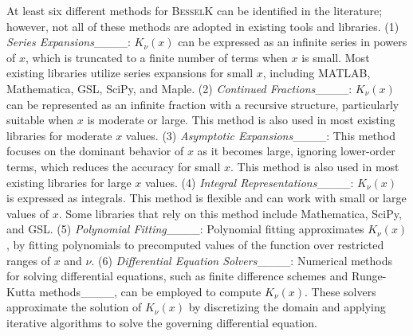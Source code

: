 At least six different methods for \textsc{BesselK} can be identified in the literature; however, not all of these methods are adopted in existing tools and libraries. (1) \textit{Series Expansions}____: \( K_\nu(x) \) can be expressed as an infinite series in powers of \( x \), which is truncated to a finite number of terms when \( x \) is small. Most existing libraries utilize series expansions for small \( x \), including MATLAB, Mathematica, GSL, SciPy, and Maple. (2) \textit{Continued Fractions}____: \( K_\nu(x) \) can be represented as an infinite fraction with a recursive structure, particularly suitable when \( x \) is moderate or large. This method is also used in most existing libraries for moderate $x$ values. (3) \textit{Asymptotic Expansions}____: This method focuses on the dominant behavior of \( x \) as it becomes large, ignoring lower-order terms, which reduces the accuracy for small \( x \). This method is also used in most existing libraries for large \( x \) values.
(4) \textit{Integral Representations}____: \( K_\nu(x) \) is expressed as integrals. This method is flexible and can work with small or large values of $x$. Some libraries that rely on this method include Mathematica, SciPy, and GSL. (5) \textit{Polynomial Fitting}____: Polynomial fitting approximates \( K_\nu(x) \), by fitting polynomials to precomputed values of the function over restricted ranges of \( x \) and \( \nu \). (6) \textit{Differential Equation Solvers}____: Numerical methods for solving differential equations, such as finite difference schemes and Runge-Kutta methods____, can be employed to compute \( K_\nu(x) \). These solvers approximate the solution of \( K_\nu(x) \) by discretizing the domain and applying iterative algorithms to solve the governing differential equation.



